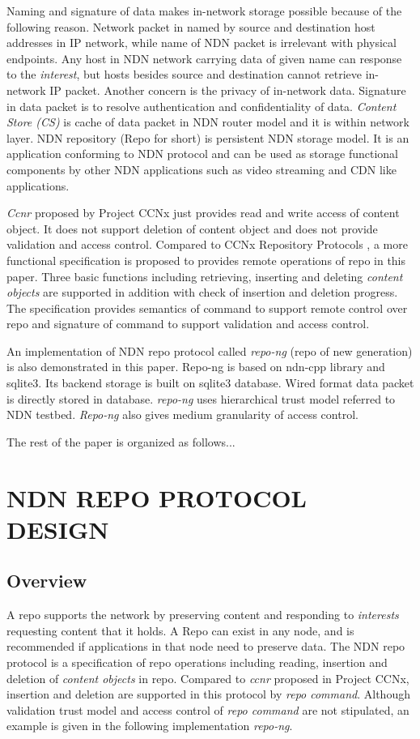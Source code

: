 \documentclass{acm_proc_article-sp}
\begin{document}
Naming and signature of data makes in-network storage possible because of the following reason. Network packet in named by source and destination host addresses in IP network, while name of NDN packet is irrelevant with physical endpoints. Any host in NDN network carrying data of given name can response to the \emph{interest}, but hosts besides source and destination cannot retrieve in-network IP packet. Another concern is the privacy of in-network data. Signature in data packet is to resolve authentication and confidentiality of data. \emph{Content Store (CS)} is cache of data packet in NDN router model and it is within network layer. NDN repository (Repo for short) is persistent NDN storage model. It is an application conforming to NDN protocol and can be used as storage functional components by other NDN applications such as video streaming and CDN like applications.

\emph{Ccnr} proposed by Project CCNx just provides read and write access of content object. It does not support deletion of content object and does not provide validation and access control. Compared to CCNx Repository Protocols \cite{ccnr}, a more functional specification is proposed to provides remote operations of repo in this paper. Three basic functions including retrieving, inserting and deleting \emph{content objects} are supported in addition with check of insertion and deletion progress. The specification provides semantics of command to support remote control over repo and signature of command to support validation and access control.

An implementation of NDN repo protocol called \emph{repo-ng} (repo of new generation) is also demonstrated in this paper. Repo-ng is based on ndn-cpp library and sqlite3. Its backend storage is built on sqlite3 database. Wired format data packet is directly stored in database. \emph{repo-ng} uses hierarchical trust model referred to NDN testbed. \cite{ndn-key} \emph{Repo-ng} also gives medium granularity of access control.

The rest of the paper is organized as follows...

\section{NDN REPO PROTOCOL DESIGN}
\subsection{Overview}
A repo supports the network by preserving content and responding to \emph{interests} requesting content that it holds. A Repo can exist in any node, and is recommended if applications in that node need to preserve data. The NDN repo protocol is a specification of repo operations including reading, insertion and deletion of \emph{content objects} in repo. Compared to \emph{ccnr} proposed in Project CCNx, insertion and deletion are supported in this protocol by \emph{repo command}. Although validation trust model and access control of \emph{repo command} are not stipulated, an example is given in the following implementation \emph{repo-ng}.
\end{document}
